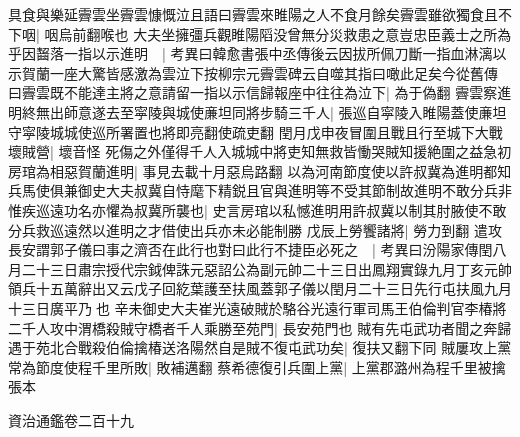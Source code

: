 具食與樂延霽雲坐霽雲慷慨泣且語曰霽雲來睢陽之人不食月餘矣霽雲雖欲獨食且不下咽|{
	咽烏前翻喉也}
大夫坐擁彊兵觀睢陽䧟没曾無分災救患之意豈忠臣義士之所為乎因齧落一指以示進明　|{
	考異曰韓愈書張中丞傳後云因拔所佩刀斷一指血淋漓以示賀蘭一座大驚皆感激為雲泣下按柳宗元霽雲碑云自噬其指曰噉此足矣今從舊傳}
曰霽雲既不能達主將之意請留一指以示信歸報座中往往為泣下|{
	為于偽翻}
霽雲察進明終無出師意遂去至寜陵與城使亷坦同將步騎三千人|{
	張巡自寜陵入睢陽蓋使亷坦守寜陵城城使巡所署置也將即亮翻使疏吏翻}
閏月戊申夜冒圍且戰且行至城下大戰壞賊營|{
	壞音怪}
死傷之外僅得千人入城城中將吏知無救皆慟哭賊知援絶圍之益急初房琯為相惡賀蘭進明|{
	事見去載十月惡烏路翻}
以為河南節度使以許叔冀為進明都知兵馬使俱兼御史大夫叔冀自恃麾下精鋭且官與進明等不受其節制故進明不敢分兵非惟疾巡遠功名亦懼為叔冀所襲也|{
	史言房琯以私憾進明用許叔冀以制其肘腋使不敢分兵救巡遠然以進明之才借使出兵亦未必能制勝}
戊辰上勞饗諸將|{
	勞力到翻}
遣攻長安謂郭子儀曰事之濟否在此行也對曰此行不捷臣必死之　|{
	考異曰汾陽家傳閏八月二十三日肅宗授代宗鉞俾誅元惡詔公為副元帥二十三日出鳳翔實錄九月丁亥元帥領兵十五萬辭出又云戊子回紇葉護至扶風蓋郭子儀以閏月二十三日先行屯扶風九月十三日廣平乃也}
辛未御史大夫崔光遠破賊於駱谷光遠行軍司馬王伯倫判官李椿將二千人攻中渭橋殺賊守橋者千人乘勝至苑門|{
	長安苑門也}
賊有先屯武功者聞之奔歸遇于苑北合戰殺伯倫擒椿送洛陽然自是賊不復屯武功矣|{
	復扶又翻下同}
賊屢攻上黨常為節度使程千里所敗|{
	敗補邁翻}
蔡希德復引兵圍上黨|{
	上黨郡潞州為程千里被擒張本}


資治通鑑卷二百十九
